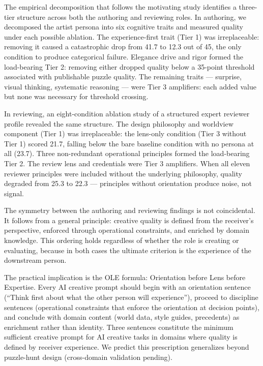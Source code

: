 The empirical decomposition that follows the motivating study identifies a three-tier
structure across both the authoring and reviewing roles. In authoring, we decomposed
the artist persona into six cognitive traits and measured quality under each possible
ablation. The experience-first trait (Tier 1) was irreplaceable: removing it caused a
catastrophic drop from 41.7 to 12.3 out of 45, the only condition to produce
categorical failure. Elegance drive and rigor formed the load-bearing Tier 2: removing
either dropped quality below a 35-point threshold associated with publishable puzzle
quality. The remaining traits --- surprise, visual thinking, systematic reasoning ---
were Tier 3 amplifiers: each added value but none was necessary for threshold crossing.

In reviewing, an eight-condition ablation study of a structured expert reviewer profile
revealed the same structure. The design philosophy and worldview component (Tier 1) was
irreplaceable: the lens-only condition (Tier 3 without Tier 1) scored 21.7, falling
below the bare baseline condition with no persona at all (23.7). Three non-redundant
operational principles formed the load-bearing Tier 2. The review lens and credentials
were Tier 3 amplifiers. When all eleven reviewer principles were included without the
underlying philosophy, quality degraded from 25.3 to 22.3 --- principles without
orientation produce noise, not signal.

The symmetry between the authoring and reviewing findings is not coincidental. It
follows from a general principle: creative quality is defined from the receiver's
perspective, enforced through operational constraints, and enriched by domain
knowledge. This ordering holds regardless of whether the role is creating or
evaluating, because in both cases the ultimate criterion is the experience of the
downstream person.

The practical implication is the OLE formula: Orientation before Lens before
Expertise. Every AI creative prompt should begin with an orientation sentence
(``Think first about what the other person will experience''), proceed to discipline
sentences (operational constraints that enforce the orientation at decision points),
and conclude with domain content (world data, style guides, precedents) as enrichment
rather than identity. Three sentences constitute the minimum sufficient creative prompt
for AI creative tasks in domains where quality is defined by receiver experience.
We predict this prescription generalizes beyond puzzle-hunt design (cross-domain validation pending).

